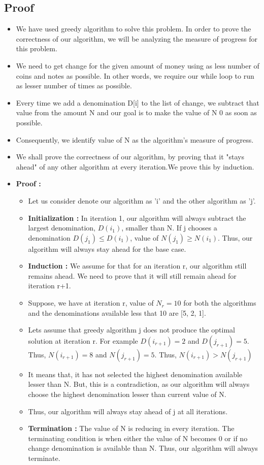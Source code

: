 \documentclass[12pt]{article}
\begin{document}
\subsection{Proof}
\begin{itemize}
    \item We have used greedy algorithm to solve this problem. In order to prove the correctness of our algorithm, we will be analyzing the measure of progress for this problem.
    \item We need to get change for the given amount of money using as less number of coins and notes as possible. In other words, we require our while loop to run as lesser number of times as possible.
    \item Every time we add a denomination D[i] to the list of change, we subtract that value from the amount N and our goal is to make the value of N 0 as soon as possible.
    \item Consequently, we identify value of N as the algorithm's measure of progress. 
    \item We shall prove the correctness of our algorithm, by proving that it "stays ahead" of any other algorithm at every iteration.We prove this by induction. 
    \item \textbf{Proof :}
    \begin{itemize}
        \item Let us consider denote our algorithm as 'i' and the other algorithm as 'j'.
        \item \textbf{Initialization : } In iteration 1, our algorithm will always subtract the largest denomination, $D(i_1)$, smaller than N. If j chooses a denomination $D(j_1) \leq D(i_1)$, value of $N(j_1) \geq N(i_1)$. Thus, our algorithm will always stay ahead for the base case.
        \item \textbf{Induction : } We assume for that for an iteration r, our algorithm still remains ahead. We need to prove that it will still remain ahead for iteration r+1.
        \item Suppose, we have at iteration r, value of $N_r= 10$ for both the algorithms and the denominations available less that 10 are [5, 2, 1]. 
        \item Lets assume that greedy algorithm j does not produce the optimal solution at iteration r. For example $D(i_{r+1}) = 2$  and $D(j_{r+1}) = 5$. Thus, $N(i_{r+1}) = 8$ and $N(j_{r+1}) = 5$. Thus, $N(i_{r+1}) > N(j_{r+1})$
        \item It means that, it has not selected the highest denomination available lesser than N. But, this is a contradiction, as our algorithm will always choose the highest denomination lesser than current value of N.
        \item Thus, our algorithm will always stay ahead of j at all iterations.
        \item \textbf{Termination :} The value of N is reducing in every iteration. The terminating condition is when either the value of N becomes 0 or if no change denomination is available than N. Thus, our algorithm will always terminate.
    \end{itemize}
\end{itemize}
\end{document}
